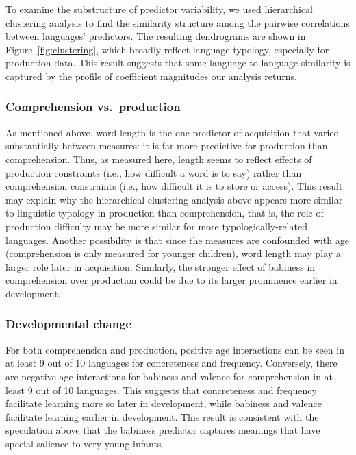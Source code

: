 \documentclass[manuscript]{stjour}
\begin{document}
To examine the substructure of predictor variability, we used
hierarchical clustering analysis to find the similarity structure among
the pairwise correlations between languages' predictors. The resulting
dendrograms are shown in Figure~\ref{fig:clustering}, which broadly
reflect language typology, especially for production data. This result
suggests that some language-to-language similarity is captured by the
profile of coefficient magnitudes our analysis returns.

\subsubsection{Comprehension vs.~production}

As mentioned above, word length is the one predictor of acquisition that
varied substantially between measures: it is far more predictive for
production than comprehension. Thus, as measured here, length seems to
reflect effects of production constraints (i.e., how difficult a word is
to say) rather than comprehension constraints (i.e., how difficult it is
to store or access). This result may explain why the hierarchical
clustering analysis above appears more similar to linguistic typology in
production than comprehension, that is, the role of production
difficulty may be more similar for more typologically-related languages.
Another possibility is that since the measures are confounded with age
(comprehension is only measured for younger children), word length may
play a larger role later in acquisition. Similarly, the stronger effect
of babiness in comprehension over production could be due to its larger
prominence earlier in development.

\subsubsection{Developmental change}

For both comprehension and production, positive age interactions can be
seen in at least 9 out of 10 languages for concreteness and frequency.
Conversely, there are negative age interactions for babiness and valence
for comprehension in at least 9 out of 10 languages. This suggests that
concreteness and frequency facilitate learning more so later in
development, while babiness and valence facilitate learning earlier in
development. This result is consistent with the speculation above that
the babiness predictor captures meanings that have special salience to
very young infants.
\end{document}
